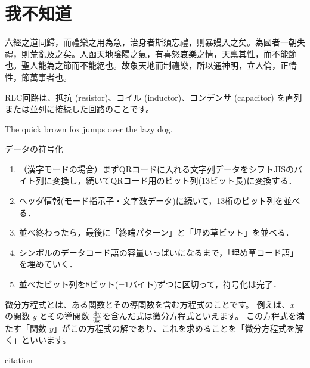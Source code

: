 \section{我不知道}

六經之道同歸，而禮樂之用為急，治身者斯須忘禮，則暴嫚入之矣。為國者一朝失禮，則荒亂及之矣。人函天地陰陽之氣，有喜怒哀樂之情，天禀其性，而不能節也。聖人能為之節而不能絕也。故象天地而制禮樂，所以通神明，立人倫，正情性，節萬事者也。

RLC回路は、抵抗 (resistor)、コイル (inductor)、コンデンサ (capacitor) を直列または並列に接続した回路のことです。

The quick brown fox jumps over the lazy dog.

データの符号化
\begin{enumerate}
	\item （漢字モードの場合）まずQRコードに入れる文字列データをシフトJISのバイト列に変換し，続いてQRコード用のビット列(13ビット長)に変換する．
	\item ヘッダ情報(モード指示子・文字数データ)に続いて，13桁のビット列を並べる．
	\item 並べ終わったら，最後に「終端パターン」と「埋め草ビット」を並べる．
	\item シンボルのデータコード語の容量いっぱいになるまで，「埋め草コード語」を埋めていく．
	\item 並べたビット列を8ビット(=1バイト)ずつに区切って，符号化は完了．
\end{enumerate}

微分方程式とは、ある関数とその導関数を含む方程式のことです。
例えば、\(x\) の関数 \(y\) とその導関数 \(\dv{y}{x}\)を含んだ式は微分方程式といえます。
この方程式を満たす「関数 \(y\)」がこの方程式の解であり、これを求めることを「微分方程式を解く」といいます。

citation \cite{sizesuu}
